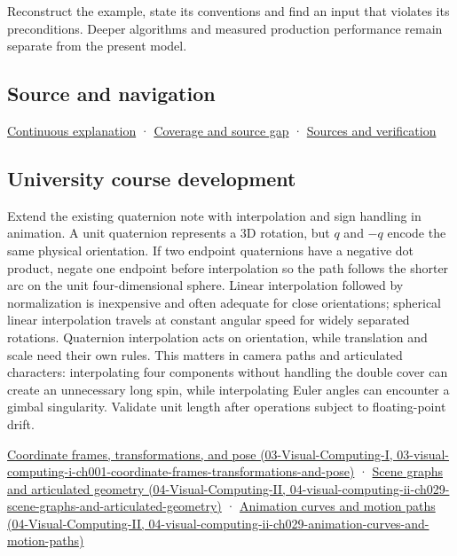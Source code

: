 Reconstruct the example, state its conventions and find an input that violates its preconditions. Deeper algorithms and measured production performance remain separate from the present model.

\subsection{Source and navigation}\label{appendix-8e61ab68f6b2-source-and-navigation}

\hyperref[01-foundations-i-ch018-keep-the-promises-visible-while-moving-between-representations]{Continuous explanation} · \hyperref[appendix-fd090d982a15-phase-7---parts-601-700]{Coverage and source gap} · \hyperref[appendix-a103e7846d21-phase-7---source-analysis-and-verification]{Sources and verification}

\subsection{University course development}\label{appendix-8e61ab68f6b2-university-course-development}

Extend the existing quaternion note with interpolation and sign handling in animation. A unit quaternion represents a 3D rotation, but \(q\) and \(-q\) encode the same physical orientation. If two endpoint quaternions have a negative dot product, negate one endpoint before interpolation so the path follows the shorter arc on the unit four-dimensional sphere. Linear interpolation followed by normalization is inexpensive and often adequate for close orientations; spherical linear interpolation travels at constant angular speed for widely separated rotations. Quaternion interpolation acts on orientation, while translation and scale need their own rules. This matters in camera paths and articulated characters: interpolating four components without handling the double cover can create an unnecessary long spin, while interpolating Euler angles can encounter a gimbal singularity. Validate unit length after operations subject to floating-point drift.

\href{../03-Visual-Computing-I/main.pdf\#nameddest=03-visual-computing-i-ch001-coordinate-frames-transformations-and-pose}{Coordinate frames, transformations, and pose (03-Visual-Computing-I, 03-visual-computing-i-ch001-coordinate-frames-transformations-and-pose)} · \href{../04-Visual-Computing-II/main.pdf\#nameddest=04-visual-computing-ii-ch029-scene-graphs-and-articulated-geometry}{Scene graphs and articulated geometry (04-Visual-Computing-II, 04-visual-computing-ii-ch029-scene-graphs-and-articulated-geometry)} · \href{../04-Visual-Computing-II/main.pdf\#nameddest=04-visual-computing-ii-ch029-animation-curves-and-motion-paths}{Animation curves and motion paths (04-Visual-Computing-II, 04-visual-computing-ii-ch029-animation-curves-and-motion-paths)}
